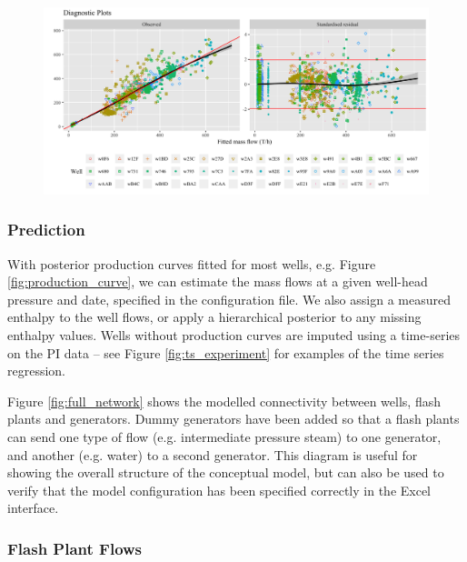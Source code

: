 \documentclass[a4paper, 12pt]{article}
\begin{document}
\begin{figure}
\centering
  \includegraphics[width=\linewidth]{media/diagnostics}
  \label{fig:diagnostics}
\end{figure}

\subsubsection{Prediction}
With posterior production curves fitted for most wells, e.g. Figure \ref{fig:production_curve}, we can estimate the mass flows at a given well-head pressure and date, specified in the configuration file. We also assign a measured enthalpy to the well flows, or apply a hierarchical posterior to any missing enthalpy values. Wells without production curves are imputed using a time-series on the PI data -- see Figure \ref{fig:ts_experiment} for examples of the time series regression.

Figure \ref{fig:full_network} shows the modelled connectivity between wells, flash plants and generators. Dummy generators have been added so that a flash plants can send one type of flow (e.g. intermediate pressure steam) to one generator, and another (e.g. water) to a second generator. This diagram is useful for showing the overall structure of the conceptual model, but can also be used to verify that the model configuration has been specified correctly in the Excel interface.

\subsubsection{Flash Plant Flows}
\end{document}
